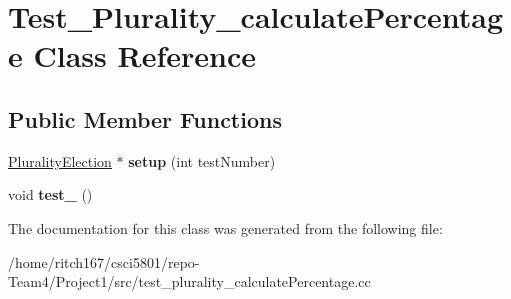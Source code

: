 \hypertarget{classTest__Plurality__calculatePercentage}{}\section{Test\+\_\+\+Plurality\+\_\+calculate\+Percentage Class Reference}
\label{classTest__Plurality__calculatePercentage}
\subsection*{Public Member Functions}
\begin{DoxyCompactItemize}
\item 
\mbox{\label{classTest__Plurality__calculatePercentage_a57cdcb44c1cb8550d67380714b270fa8}} 
\hyperlink{classPluralityElection}{Plurality\+Election} $\ast$ {\bfseries setup} (int test\+Number)
\item 
\mbox{\label{classTest__Plurality__calculatePercentage_a10a43d22e21505d18cb2c56f83d4a383}} 
void {\bfseries test\+\_} ()
\end{DoxyCompactItemize}


The documentation for this class was generated from the following file\+:\begin{DoxyCompactItemize}
\item 
/home/ritch167/csci5801/repo-\/\+Team4/\+Project1/src/test\+\_\+plurality\+\_\+calculate\+Percentage.\+cc\end{DoxyCompactItemize}

